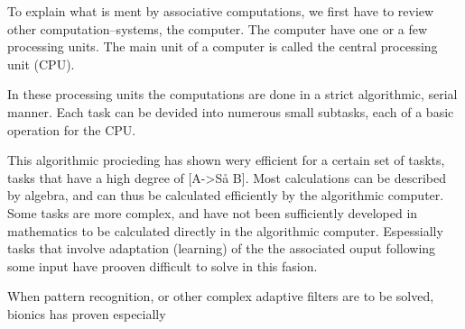 To explain what is ment by associative computations, we first have to review other computation--systems, the computer.
The computer have one or a few processing units. The main unit of a computer is called the central processing unit (CPU).

In these processing units the computations are done in a strict algorithmic, serial manner.
Each task can be devided into numerous small subtasks, each of a basic operation for the CPU.

This algorithmic procieding has shown wery efficient for a certain set of taskts, tasks that have a high degree of [A->Så B]. 
Most calculations can be described by algebra, and can thus be calculated efficiently by the algorithmic computer.
Some tasks are more complex, and have not been sufficiently developed in mathematics to be calculated directly in the algorithmic computer.
Espessially tasks that involve adaptation (learning) of the the associated ouput following some input have prooven difficult to solve in this fasion.

When pattern recognition, or other complex adaptive filters are to be solved, bionics has proven especially 














